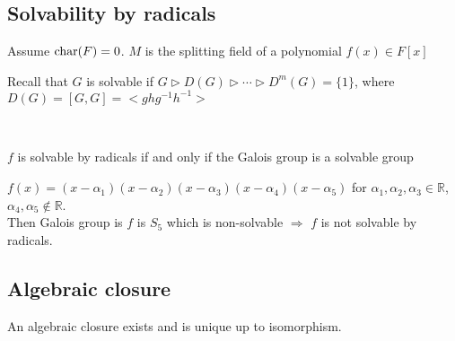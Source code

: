 \subsection{Solvability by radicals}
Assume  $ \operatorname{char}(F)=0 $.  $ M  $ is the splitting field of a polynomial  $ f(x)\in F[x] $  \\
Recall that  $ G  $ is solvable if  $ G\triangleright D(G)\triangleright \cdots \triangleright D^m(G)=\{1\} $, where  $ D(G)=[G,G]=<ghg^{-1}h^{-1}> $ 
\begin{proposition}
    \,
\end{proposition}
\begin{theorem}
     $ f  $ is solvable by radicals if and only if  the Galois group is a solvable group 
\end{theorem}
\begin{example}
     $ f(x)=(x-\alpha_1)(x-\alpha_2)(x-\alpha_3)(x-\alpha_4)(x-\alpha_5) $ for  $ \alpha_1,\alpha_2,\alpha_3\in \mathbb{R} $,  $ \alpha_4,\alpha_5\not\in \mathbb{R} $.\\
     Then  Galois group is  $ f  $ is  $ S_5  $ which is non-solvable  $ \Rightarrow  $  $ f  $ is not solvable by radicals.     
\end{example}
\subsection{Algebraic closure}
\begin{theorem}[Steinitz]
    An algebraic closure exists and is unique up to isomorphism.
\end{theorem}